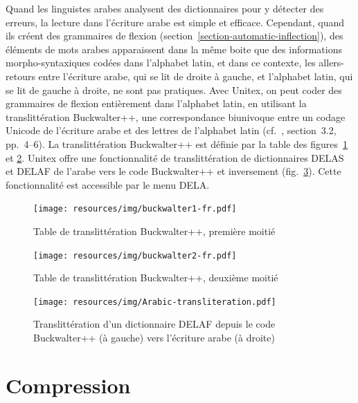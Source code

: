 Quand les linguistes arabes analysent des dictionnaires pour y détecter des erreurs,
la lecture dans l'écriture arabe est simple et efficace. Cependant, quand ils
créent des grammaires de flexion (section~\ref{section-automatic-inflection}), des éléments
de mots arabes apparaissent dans la même boite que des informations morpho-syntaxiques
codées dans l'alphabet latin, et dans ce contexte, les allers-retours entre l'écriture arabe,
qui se lit de droite à gauche, et l'alphabet latin, qui se lit de gauche à droite, ne sont pas
pratiques. Avec Unitex, on peut coder des grammaires de flexion entièrement dans l'alphabet
latin, en utilisant la translittération Buckwalter++, une correspondance
biunivoque entre un codage Unicode de l'écriture arabe et des lettres de l'alphabet latin
(cf.~\cite{neme2011}, section~3.2, pp.~4--6). La translittération Buckwalter++ est définie
par la table des figures~\ref{buckwalter1} et \ref{buckwalter2}.
Unitex offre une fonctionnalité de translittération de dictionnaires DELAS et DELAF de l'arabe
vers le code Buckwalter++ et inversement (fig.~\ref{Arabic-transliteration}). Cette fonctionnalité
est accessible par le menu DELA.

\begin{figure}[!p]
\begin{center}
\texttt{[image: resources/img/buckwalter1-fr.pdf]}
\caption{Table de translittération Buckwalter++, première moitié\label{buckwalter1}}
\end{center}
\end{figure}

\begin{figure}[!p]
\begin{center}
\texttt{[image: resources/img/buckwalter2-fr.pdf]}
\caption{Table de translittération Buckwalter++, deuxième moitié\label{buckwalter2}}
\end{center}
\end{figure}

\begin{figure}[!ht]
\begin{center}
\texttt{[image: resources/img/Arabic-transliteration.pdf]}
\caption{Translittération d'un dictionnaire DELAF
depuis le code Buckwalter++ (à gauche) vers l'écriture arabe (à droite)\label{Arabic-transliteration}}
\end{center}
\end{figure}


\section{Compression}

